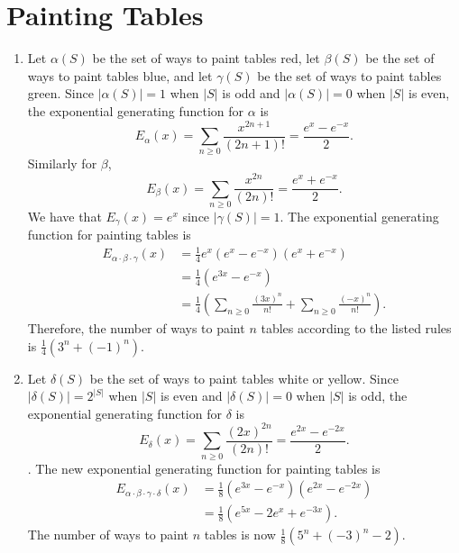 \documentclass{article}
\begin{document}
\section{Painting Tables}
   \begin{enumerate}
      \item 
         Let $\alpha(S)$ be the set of ways to paint tables red,
         let $\beta(S)$ be the set of ways to paint tables blue,
         and let $\gamma(S)$ be the set of ways to paint tables green.
         Since $|\alpha(S)| = 1$ when $|S|$ is odd and
         $|\alpha(S)| = 0$ when $|S|$ is even,
         the exponential generating function for $\alpha$ is 
         \[
            E_\alpha(x) 
            = \sum_{n \geq 0} \frac{x^{2n+1}}{(2n+1)!}
            = \frac{e^x - e^{-x}}{2}.
         \]
         Similarly for $\beta$,
         \[
            E_\beta(x) 
            = \sum_{n \geq 0} \frac{x^{2n}}{(2n)!}
            = \frac{e^x + e^{-x}}{2}.
         \]
         We have that $E_\gamma(x) = e^x$ since $|\gamma(S)| = 1$.
         The exponential generating function for painting tables is
         \begin{align*}
            E_{\alpha\cdot\beta\cdot\gamma}(x) 
            &= \frac{1}{4}e^x(e^x - e^{-x})(e^x + e^{-x}) \\
            &= \frac{1}{4}(e^{3x}-e^{-x}) \\
            &= \frac{1}{4}\left(\sum_{n\geq 0} \frac{(3x)^n}{n!} 
               + \sum_{n\geq 0} \frac{(-x)^n}{n!}\right).
         \end{align*}
         Therefore, the number of ways to paint $n$ tables 
         according to the listed rules is $\frac{1}{4}(3^n + (-1)^n)$.
      \item Let $\delta(S)$ be the set of ways to paint tables white or yellow.
         Since $|\delta(S)| = 2^{|S|}$ when $|S|$ is even and
         $|\delta(S)| = 0$ when $|S|$ is odd,
         the exponential generating function for $\delta$ is 
         \[
            E_\delta(x) 
            = \sum_{n \geq 0} \frac{(2x)^{2n}}{(2n)!}
            = \frac{e^{2x} - e^{-2x}}{2}.
         \].
         The new exponential generating function for painting tables is 
         \begin{align*}
            E_{\alpha\cdot\beta\cdot\gamma\cdot\delta}(x) 
            &= \frac{1}{8}(e^{3x}-e^{-x})(e^{2x} - e^{-2x}) \\
            &= \frac{1}{8}(e^{5x}-2e^x+e^{-3x}).
         \end{align*}
         The number of ways to paint $n$ tables is now 
         $\frac{1}{8}(5^n+(-3)^n-2)$.
   \end{enumerate}
   \newpage
\end{document}
